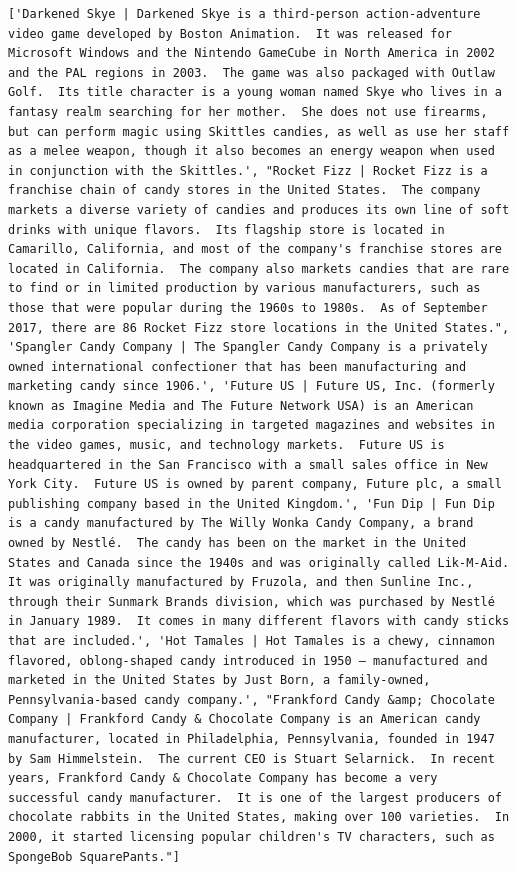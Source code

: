 \begin{instructbox}
\begin{lstlisting}[breakindent=0pt, breaklines=true, breakatwhitespace=true, frame=single, backgroundcolor=\color{green!10}]
    ['Darkened Skye | Darkened Skye is a third-person action-adventure video game developed by Boston Animation.  It was released for Microsoft Windows and the Nintendo GameCube in North America in 2002 and the PAL regions in 2003.  The game was also packaged with Outlaw Golf.  Its title character is a young woman named Skye who lives in a fantasy realm searching for her mother.  She does not use firearms, but can perform magic using Skittles candies, as well as use her staff as a melee weapon, though it also becomes an energy weapon when used in conjunction with the Skittles.', "Rocket Fizz | Rocket Fizz is a franchise chain of candy stores in the United States.  The company markets a diverse variety of candies and produces its own line of soft drinks with unique flavors.  Its flagship store is located in Camarillo, California, and most of the company's franchise stores are located in California.  The company also markets candies that are rare to find or in limited production by various manufacturers, such as those that were popular during the 1960s to 1980s.  As of September 2017, there are 86 Rocket Fizz store locations in the United States.", 'Spangler Candy Company | The Spangler Candy Company is a privately owned international confectioner that has been manufacturing and marketing candy since 1906.', 'Future US | Future US, Inc. (formerly known as Imagine Media and The Future Network USA) is an American media corporation specializing in targeted magazines and websites in the video games, music, and technology markets.  Future US is headquartered in the San Francisco with a small sales office in New York City.  Future US is owned by parent company, Future plc, a small publishing company based in the United Kingdom.', 'Fun Dip | Fun Dip is a candy manufactured by The Willy Wonka Candy Company, a brand owned by Nestlé.  The candy has been on the market in the United States and Canada since the 1940s and was originally called Lik-M-Aid.  It was originally manufactured by Fruzola, and then Sunline Inc., through their Sunmark Brands division, which was purchased by Nestlé in January 1989.  It comes in many different flavors with candy sticks that are included.', 'Hot Tamales | Hot Tamales is a chewy, cinnamon flavored, oblong-shaped candy introduced in 1950 — manufactured and marketed in the United States by Just Born, a family-owned, Pennsylvania-based candy company.', "Frankford Candy &amp; Chocolate Company | Frankford Candy & Chocolate Company is an American candy manufacturer, located in Philadelphia, Pennsylvania, founded in 1947 by Sam Himmelstein.  The current CEO is Stuart Selarnick.  In recent years, Frankford Candy & Chocolate Company has become a very successful candy manufacturer.  It is one of the largest producers of chocolate rabbits in the United States, making over 100 varieties.  In 2000, it started licensing popular children's TV characters, such as SpongeBob SquarePants."]

\end{lstlisting}
\end{instructbox}

